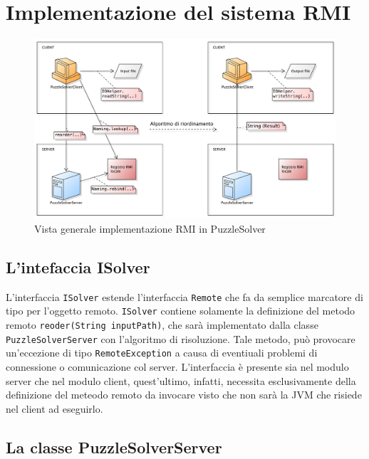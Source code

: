 %
%

\section{Implementazione del sistema RMI}

\begin{figure}[htbp]
    \centering
    \centerline{\includegraphics[scale=0.4]{./images/rmi.pdf}}
    \caption{Vista generale implementazione RMI in PuzzleSolver}
\end{figure}

\subsection{L'intefaccia ISolver}

L'interfaccia \texttt{ISolver} estende l'interfaccia \texttt{Remote} che fa da semplice marcatore di tipo
per l'oggetto remoto. \texttt{ISolver} contiene solamente la definizione del metodo remoto \texttt{reoder(String inputPath)},
che sarà implementato dalla classe \texttt{PuzzleSolverServer} con l'algoritmo di risoluzione. Tale metodo, può provocare
un'eccezione di tipo \texttt{RemoteException} a causa di eventiuali problemi di connessione o comunicazione col server.
L'interfaccia è presente sia nel modulo server che nel modulo client, quest'ultimo, infatti, necessita esclusivamente della
definizione del meteodo remoto da invocare visto che non sarà la JVM che risiede nel client ad eseguirlo.


\subsection{La classe PuzzleSolverServer}

